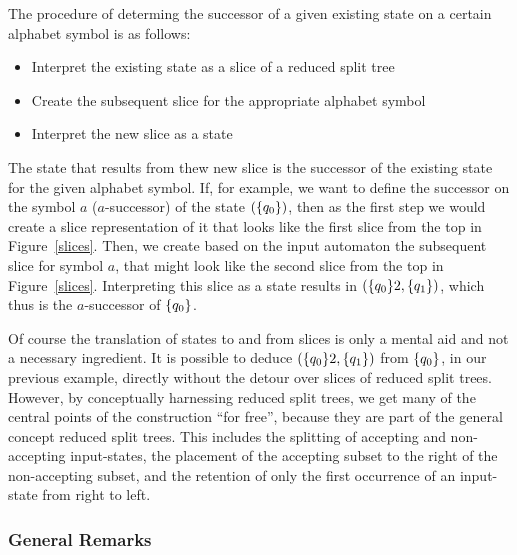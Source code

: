 The procedure of determing the successor of a given existing state on a certain alphabet symbol is as follows:
\begin{itemize}
\item Interpret the existing state as a slice of a reduced split tree
\item Create the subsequent slice for the appropriate alphabet symbol
\item Interpret the new slice as a state
\end{itemize}
The state that results from thew new slice is the successor of the existing state for the given alphabet symbol. If, for example, we want to define the successor on the symbol $a$ ($a$-successor) of the state $(\{q_{0}\})$, then as the first step we would create a slice representation of it that looks like the first slice from the top in Figure~\ref{slices}. Then, we create based on the input automaton the subsequent slice for symbol $a$, that might look like the second slice from the top in Figure~\ref{slices}. Interpreting this slice as a state results in $(\{q_{0}\}2,\{q_{1}\})$, which thus is the $a$-successor of $\{q_{0}\}$.

Of course the translation of states to and from slices is only a mental aid and not a necessary ingredient. It is possible to deduce $(\{q_{0}\}2,\{q_{1}\})$ from $\{q_{0}\}$, in our previous example, directly without the detour over slices of reduced split trees. However, by conceptually harnessing reduced split trees, we get many of the central points of the construction ``for free'', because they are part of the general concept reduced split trees. This includes the splitting of accepting and non-accepting input-states, the placement of the accepting subset to the right of the non-accepting subset, and the retention of only the first occurrence of an input-state from right to left.

\subsubsection{General Remarks}








